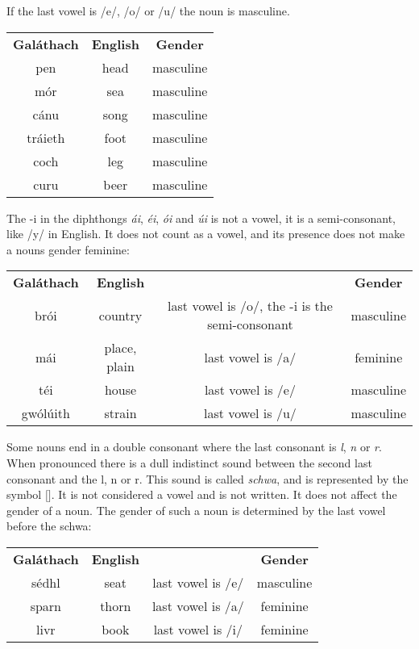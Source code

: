 If the last vowel is /e/, /o/ or /u/ the noun is masculine.
\begin{table}[H]
\centering
\begin{tabular}{ccc}
  \toprule
  \textbf{Gal\'{a}thach} & \textbf{English} & \textbf{Gender}\\
  \cmidrule(lr){1-1}\cmidrule(lr){2-2}\cmidrule(lr){3-3}
  pen & head & masculine\\
  m\'{o}r & sea & masculine\\
  c\'{a}nu & song & masculine\\
  tr\'{a}ieth & foot & masculine\\
  coch & leg & masculine\\
  curu & beer & masculine\\
  \bottomrule
\end{tabular}
\label{example_gender_last_vowel_eou}
\end{table}

The -i in the diphthongs \textit{\'{a}i}, \textit{\'{e}i}, \textit{\'{o}i} and \textit{\'{u}i} is not a vowel, it is a semi-consonant, like /y/ in English. It does not count as a vowel, and its presence does not make a nouns gender feminine:
\begin{table}[H]
\centering
\begin{tabular}{cccc}
  \toprule
  \textbf{Gal\'{a}thach} & \textbf{English} & & \textbf{Gender}\\
  \cmidrule(lr){1-1}\cmidrule(lr){2-2}\cmidrule(lr){4-4}
  br\'{o}i & country & last vowel is /o/, the -i is the semi-consonant & masculine\\
  m\'{a}i & place, plain & last vowel is /a/ & feminine\\
  t\'{e}i & house & last vowel is /e/ & masculine\\
  gw\'{o}l\'{u}ith & strain & last vowel is /u/ & masculine\\
  \bottomrule
\end{tabular}
\label{example_gender_last_vowel_semi_consonant}
\end{table}

Some nouns end in a double consonant where the last consonant is \textit{l}, \textit{n} or \textit{r}. When pronounced there is a dull indistinct sound between the second last consonant and the l, n or r. This sound is called \textit{schwa}, and is represented by the symbol $[$\textschwa$]$. It is not considered a vowel and is not written. It does not affect the gender of a noun. The gender of such a noun is determined by the last vowel before the schwa:
\begin{table}[H]
\centering
\begin{tabular}{cccc}
  \toprule
  \textbf{Gal\'{a}thach} & \textbf{English} & & \textbf{Gender}\\
  \cmidrule(lr){1-1}\cmidrule(lr){2-2}\cmidrule(lr){4-4}
  s\'{e}dhl & seat & last vowel is /e/ & masculine\\
  sparn & thorn & last vowel is /a/ & feminine\\
  livr & book & last vowel is /i/ & feminine\\
  \bottomrule
\end{tabular}
\label{example_gender_end_in_double_consonant}
\end{table}

